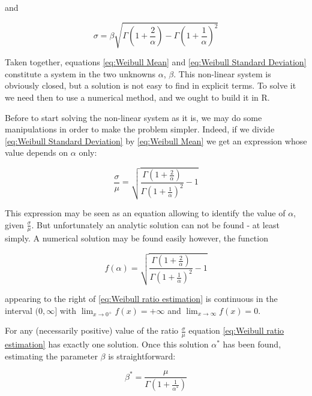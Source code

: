 \documentclass[a4paper,10pt]{book}
\begin{document}
\noindent and

\begin{equation}\label{eq:Weibull Standard Deviation}
  \sigma = \beta \sqrt{\Gamma \left( 1 + \frac{2}{\alpha} \right) - \Gamma \left( 1 + \frac{1}{\alpha} \right)^{2}}
\end{equation}

Taken together, equations \ref{eq:Weibull Mean} and \ref{eq:Weibull Standard Deviation} constitute a system in the two unknowns $ \alpha $, $ \beta $. This non-linear system is obviously closed, but a solution is not easy to find in explicit terms. To solve it we need then to use a numerical method, and we ought to build it in R.

Before to start solving the non-linear system as it is, we may do some manipulations in order to make the problem simpler. Indeed, if we divide \ref{eq:Weibull Standard Deviation} by \ref{eq:Weibull Mean} we get an expression whose value depends on $ \alpha $ only:

\begin{equation}\label{eq:Weibull ratio estimation}
  \frac{\sigma}{\mu} = \sqrt{\frac{\Gamma \left( 1 + \frac{2}{\alpha} \right)}{\Gamma \left( 1 + \frac{1}{\alpha} \right)^{2}} - 1}
\end{equation}

This expression may be seen as an equation allowing to identify the value of $ \alpha $, given $ \frac{\sigma}{\mu} $. But unfortunately an analytic solution can not be found - at least simply. A numerical solution may be found easily however, the function

\begin{equation}\label{eq:Weibull ratio estimation as function}
  f\left( \alpha \right) = \sqrt{\frac{\Gamma \left( 1 + \frac{2}{\alpha} \right)}{\Gamma \left( 1 + \frac{1}{\alpha} \right)^{2}} - 1}
\end{equation}

\noindent appearing to the right of \ref{eq:Weibull ratio estimation} is continuous in the interval $ (0,\infty] $ with $ \lim_{x \rightarrow 0^{+}} f(x) = +\infty $ and $ \lim_{x \rightarrow \infty} f(x) = 0 $.

For any (necessarily positive) value of the ratio $ \frac{\sigma}{\mu} $ equation \ref{eq:Weibull ratio estimation} has exactly one solution. Once this solution $ \alpha^{*} $ has been found, estimating the parameter $ \beta $ is straightforward:

\begin{equation}\label{eq:Weibull beta estimation}
  \beta^{*} = \frac{\mu}{\Gamma \left( 1 + \frac{1}{\alpha^{*}} \right)}
\end{equation}
\end{document}
